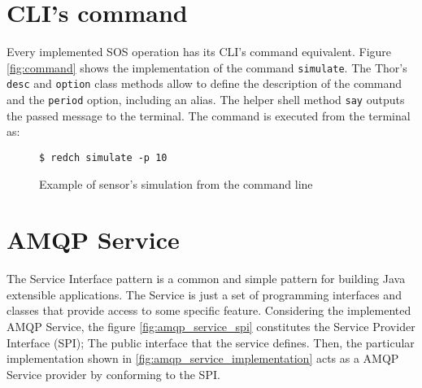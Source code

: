 \section{CLI's command}

Every implemented SOS operation has its CLI's command equivalent. Figure \ref{fig:command} shows the implementation of the command \texttt{simulate}. The Thor's \texttt{desc} and \texttt{option} class methods allow to define the description of the command and the \texttt{period} option, including an alias. The helper shell method \texttt{say} outputs the passed message to the terminal. The command is executed from the terminal as:

\begin{figure}[H]
  \centering
  \texttt{\$ redch simulate -p 10}
  \caption{Example of sensor's simulation from the command line}
\end{figure}


\section{AMQP Service}

The Service Interface pattern is a common and simple pattern for building Java extensible applications. The Service is just a set of programming interfaces and classes that provide access to some specific feature. Considering the implemented AMQP Service, the figure \ref{fig:amqp_service_spi} constitutes the Service Provider Interface (SPI); The public interface that the service defines. Then, the particular implementation shown in \ref{fig:amqp_service_implementation} acts as a AMQP Service provider by conforming to the SPI.

